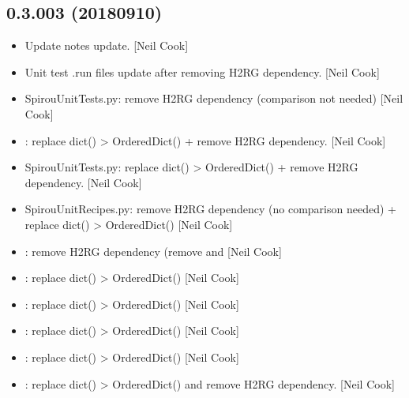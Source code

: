 \documentclass[a4paper,10pt,english]{report}
\begin{document}
\subsection{0.3.003 (2018\sphinxhyphen{}09\sphinxhyphen{}10)}
\label{\detokenize{misc/changelog:id350}}\begin{itemize}
\item {} 
Update notes \sphinxhyphen{} update. {[}Neil Cook{]}

\item {} 
Unit test .run files \sphinxhyphen{} update after removing H2RG dependency. {[}Neil
Cook{]}

\item {} 
SpirouUnitTests.py: remove H2RG dependency (comparison not needed)
{[}Neil Cook{]}

\item {} 
: replace dict() \textendash{}\textgreater{} OrderedDict() + remove H2RG
dependency. {[}Neil Cook{]}

\item {} 
SpirouUnitTests.py: replace dict() \textendash{}\textgreater{} OrderedDict() + remove H2RG
dependency. {[}Neil Cook{]}

\item {} 
SpirouUnitRecipes.py: remove H2RG dependency (no comparison needed) +
replace dict() \textendash{}\textgreater{} OrderedDict() {[}Neil Cook{]}

\item {} 
: remove H2RG dependency (remove 
and  {[}Neil Cook{]}

\item {} 
: replace dict() \textendash{}\textgreater{} OrderedDict() {[}Neil Cook{]}

\item {} 
: replace dict() \textendash{}\textgreater{} OrderedDict() {[}Neil Cook{]}

\item {} 
: replace dict() \textendash{}\textgreater{} OrderedDict() {[}Neil Cook{]}

\item {} 
: replace dict() \textendash{}\textgreater{} OrderedDict() {[}Neil Cook{]}

\item {} 
: replace dict() \textendash{}\textgreater{} OrderedDict() and remove H2RG
dependency. {[}Neil Cook{]}


\end{itemize}
\end{document}
